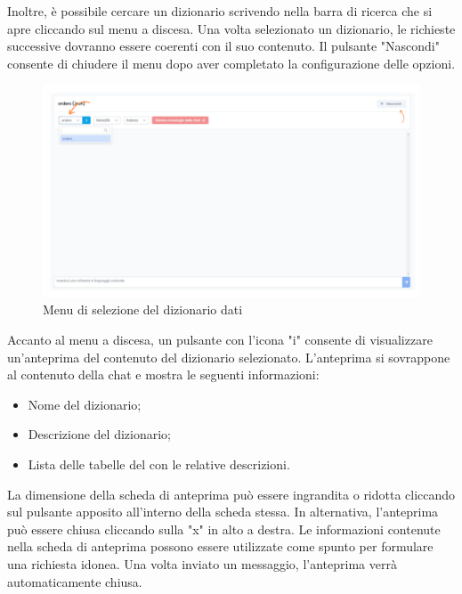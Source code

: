 \par Inoltre, è possibile cercare un dizionario scrivendo nella barra di ricerca che si apre cliccando sul menu a discesa. Una volta selezionato un dizionario, le richieste successive dovranno essere coerenti con il suo contenuto. Il pulsante "Nascondi" consente di chiudere il menu dopo aver completato la configurazione delle opzioni.

\begin{figure}[H]
  \centering
  \includegraphics[width=1\textwidth]{assets/cambio_dizionariodati.png}
  \caption{Menu di selezione del dizionario dati}
\end{figure}

 \label{sec:info-dizionario}

\par Accanto al menu a discesa, un pulsante con l'icona "i" consente di visualizzare un'anteprima del contenuto del dizionario selezionato. L'anteprima si sovrappone al contenuto della chat e mostra le seguenti informazioni:
\begin{itemize}
  \item Nome del dizionario;
  \item Descrizione del dizionario;
  \item Lista delle tabelle del  con le relative descrizioni.
\end{itemize}

\vspace{0.5\baselineskip}
\par La dimensione della scheda di anteprima può essere ingrandita o ridotta cliccando sul pulsante apposito all'interno della scheda stessa. In alternativa, l'anteprima può essere chiusa cliccando sulla "x" in alto a destra. Le informazioni contenute nella scheda di anteprima possono essere utilizzate come spunto per formulare una richiesta idonea. Una volta inviato un messaggio, l'anteprima verrà automaticamente chiusa.

